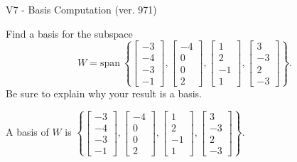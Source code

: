 \begin{exercise}
  \begin{exerciseTitle}V7 - Basis Computation (ver. 971)\end{exerciseTitle}
  \begin{exerciseStatement}
    Find a basis for the subspace 
\[W=\mathrm{span}\ \left\{\left[\begin{array}{r}
-3 \\
-4 \\
-3 \\
-1
\end{array}\right] , \left[\begin{array}{r}
-4 \\
0 \\
0 \\
2
\end{array}\right] , \left[\begin{array}{r}
1 \\
2 \\
-1 \\
1
\end{array}\right] , \left[\begin{array}{r}
3 \\
-3 \\
2 \\
-3
\end{array}\right]\right\}.\]
 Be sure to explain why your result is a basis.


  \end{exerciseStatement}
  \begin{exerciseAnswer}
   A basis of \(W\) is  \(\left\{\left[\begin{array}{r}
-3 \\
-4 \\
-3 \\
-1
\end{array}\right] , \left[\begin{array}{r}
-4 \\
0 \\
0 \\
2
\end{array}\right] , \left[\begin{array}{r}
1 \\
2 \\
-1 \\
1
\end{array}\right] , \left[\begin{array}{r}
3 \\
-3 \\
2 \\
-3
\end{array}\right]\right\}\).
  


  \end{exerciseAnswer}
\end{exercise}